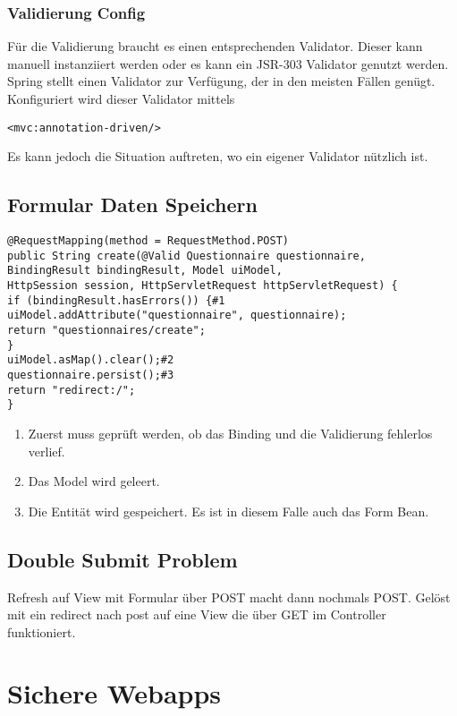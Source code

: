 \documentclass[a4paper,10pt]{scrreprt}
\begin{document}
{\subsection{Validierung Config}
Für die Validierung braucht es einen entsprechenden Validator. Dieser kann manuell instanziiert
werden oder es kann ein JSR-303 Validator genutzt werden. Spring stellt einen Validator zur
Verfügung, der in den meisten Fällen genügt. Konfiguriert wird dieser Validator mittels
\begin{verbatim}
<mvc:annotation-driven/> 
\end{verbatim}

Es kann jedoch die Situation auftreten, wo ein eigener Validator nützlich ist.

\section{Formular Daten Speichern}
\begin{lstlisting}[caption=Speichern mit POST Method Controller]
 @RequestMapping(method = RequestMethod.POST)
public String create(@Valid Questionnaire questionnaire,
BindingResult bindingResult, Model uiModel,
HttpSession session, HttpServletRequest httpServletRequest) {
if (bindingResult.hasErrors()) {#1
uiModel.addAttribute("questionnaire", questionnaire);
return "questionnaires/create";
}
uiModel.asMap().clear();#2
questionnaire.persist();#3
return "redirect:/";
}
\end{lstlisting}
\begin{enumerate}
 \item Zuerst muss geprüft werden, ob das Binding und die Validierung fehlerlos verlief.
 \item Das Model wird geleert.
\item Die Entität wird gespeichert. Es ist in diesem Falle auch das Form Bean.
\end{enumerate}

\section{Double Submit Problem}
Refresh auf View mit Formular über POST macht dann nochmals POST.
Gelöst mit ein redirect nach post auf eine View die über GET im Controller funktioniert.

\chapter{Sichere Webapps}


}
\end{document}
